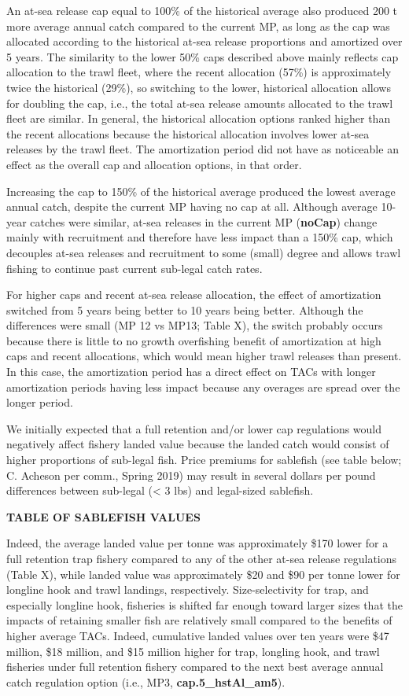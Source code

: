 \documentclass[11pt]{book}
\begin{document}
An at-sea release cap equal to 100\% of the historical average also produced 200 t more average annual catch compared to the current MP, as long as the cap was allocated according to the historical at-sea release proportions and amortized over 5 years. The similarity to the lower 50\% caps described above mainly reflects cap allocation to the trawl fleet, where the recent allocation (57\%) is approximately twice the historical (29\%), so switching to the lower, historical allocation allows for doubling the cap, i.e., the total at-sea release amounts allocated to the trawl fleet are similar. In general, the historical allocation options ranked higher than the recent allocations because the historical allocation involves lower at-sea releases by the trawl fleet. The amortization period did not have as noticeable an effect as the overall cap and allocation options, in that order.

Increasing the cap to 150\% of the historical average produced the lowest average annual catch, despite the current MP having no cap at all. Although average 10-year catches were similar, at-sea releases in the current MP (\textbf{noCap}) change mainly with recruitment and therefore have less impact than a 150\% cap, which decouples at-sea releases and recruitment to some (small) degree and allows trawl fishing to continue past current sub-legal catch rates.

For higher caps and recent at-sea release allocation, the effect of amortization switched from 5 years being better to 10 years being better. Although the differences were small (MP 12 vs MP13; Table X), the switch probably occurs because there is little to no growth overfishing benefit of amortization at high caps and recent allocations, which would mean higher trawl releases than present. In this case, the amortization period has a direct effect on TACs with longer amortization periods having less impact because any overages are spread over the longer period.

We initially expected that a full retention and/or lower cap regulations would negatively affect fishery landed value because the landed catch would consist of higher proportions of sub-legal fish. Price premiums for sablefish (see table below; C. Acheson per comm., Spring 2019) may result in several dollars per pound differences between sub-legal (\textless{} 3 lbs) and legal-sized sablefish.

\textbf{TABLE OF SABLEFISH VALUES}

Indeed, the average landed value per tonne was approximately \$170 lower for a full retention trap fishery compared to any of the other at-sea release regulations (Table X), while landed value was approximately \$20 and \$90 per tonne lower for longline hook and trawl landings, respectively. Size-selectivity for trap, and especially longline hook, fisheries is shifted far enough toward larger sizes that the impacts of retaining smaller fish are relatively small compared to the benefits of higher average TACs. Indeed, cumulative landed values over ten years were \$47 million, \$18 million, and \$15 million higher for trap, longling hook, and trawl fisheries under full retention fishery compared to the next best average annual catch regulation option (i.e., MP3, \textbf{cap.5\_hstAl\_am5}).
\end{document}
